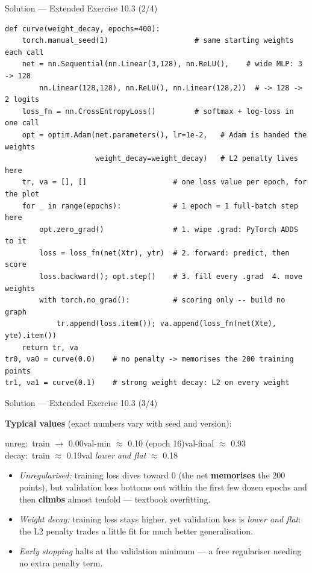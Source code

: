\documentclass[aspectratio=169,11pt]{beamer}
\begin{document}
\begin{frame}[fragile]{Solution --- Extended Exercise 10.3 (2/4)}
\begin{solutionbox}
\begin{lstlisting}[basicstyle=\ttfamily\scriptsize\linespread{0.88}\selectfont]
def curve(weight_decay, epochs=400):
    torch.manual_seed(1)                    # same starting weights each call
    net = nn.Sequential(nn.Linear(3,128), nn.ReLU(),    # wide MLP: 3 -> 128
        nn.Linear(128,128), nn.ReLU(), nn.Linear(128,2))  # -> 128 -> 2 logits
    loss_fn = nn.CrossEntropyLoss()         # softmax + log-loss in one call
    opt = optim.Adam(net.parameters(), lr=1e-2,   # Adam is handed the weights
                     weight_decay=weight_decay)   # L2 penalty lives here
    tr, va = [], []                    # one loss value per epoch, for the plot
    for _ in range(epochs):            # 1 epoch = 1 full-batch step here
        opt.zero_grad()                # 1. wipe .grad: PyTorch ADDS to it
        loss = loss_fn(net(Xtr), ytr)  # 2. forward: predict, then score
        loss.backward(); opt.step()    # 3. fill every .grad  4. move weights
        with torch.no_grad():          # scoring only -- build no graph
            tr.append(loss.item()); va.append(loss_fn(net(Xte), yte).item())
    return tr, va
tr0, va0 = curve(0.0)    # no penalty -> memorises the 200 training points
tr1, va1 = curve(0.1)    # strong weight decay: L2 on every weight
\end{lstlisting}
\end{solutionbox}
\end{frame}

\begin{frame}{Solution --- Extended Exercise 10.3 (3/4)}
\begin{solutionbox}
  \textbf{Typical values} (exact numbers vary with seed and version):
  \begin{center}\ttfamily\footnotesize
  unreg:\ train $\to$ 0.00\quad val-min $\approx$ 0.10 (epoch 16)\quad val-final $\approx$ 0.93\\[2pt]
  decay:\ train $\approx$ 0.19\quad val \emph{lower and flat} $\approx$ 0.18
  \end{center}
  \begin{itemize}
    \item \emph{Unregularised:} training loss dives toward $0$ (the net \textbf{memorises}
          the $200$ points), but validation loss bottoms out within the first few dozen
          epochs and then \textbf{climbs} almost tenfold --- textbook overfitting.
    \item \emph{Weight decay:} training loss stays higher, yet validation loss is
          \emph{lower and flat}: the L2 penalty trades a little fit for much
          better generalisation.
    \item \emph{Early stopping} halts at the validation minimum --- a free regulariser
          needing no extra penalty term.
  \end{itemize}
\end{solutionbox}
\end{frame}
\end{document}
